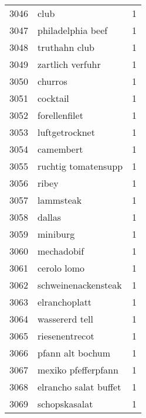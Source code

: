 \begin{tabular}{llr}
3046 &                                               club &      1 \\
3047 &                                  philadelphia beef &      1 \\
3048 &                                      truthahn club &      1 \\
3049 &                                   zartlich verfuhr &      1 \\
3050 &                                            churros &      1 \\
3051 &                                           cocktail &      1 \\
3052 &                                      forellenfilet &      1 \\
3053 &                                     luftgetrocknet &      1 \\
3054 &                                          camembert &      1 \\
3055 &                                ruchtig tomatensupp &      1 \\
3056 &                                              ribey &      1 \\
3057 &                                          lammsteak &      1 \\
3058 &                                             dallas &      1 \\
3059 &                                           miniburg &      1 \\
3060 &                                         mechadobif &      1 \\
3061 &                                        cerolo lomo &      1 \\
3062 &                                schweinenackensteak &      1 \\
3063 &                                      elranchoplatt &      1 \\
3064 &                                     wassererd tell &      1 \\
3065 &                                     riesenentrecot &      1 \\
3066 &                                   pfann alt bochum &      1 \\
3067 &                                mexiko pfefferpfann &      1 \\
3068 &                              elrancho salat buffet &      1 \\
3069 &                                      schopskasalat &      1 \\

\end{tabular}
